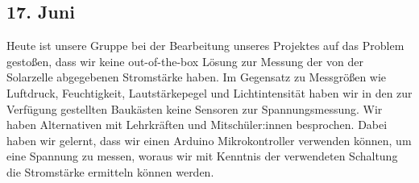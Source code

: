 \subsection{17. Juni}
Heute ist unsere Gruppe bei der Bearbeitung unseres Projektes auf das Problem gestoßen, dass wir keine out-of-the-box Lösung zur Messung der von der Solarzelle abgegebenen Stromstärke haben. Im Gegensatz zu Messgrößen wie Luftdruck, Feuchtigkeit, Lautstärkepegel und Lichtintensität haben wir in den zur Verfügung gestellten Baukästen keine Sensoren zur Spannungsmessung. Wir haben Alternativen mit Lehrkräften und Mitschüler:innen besprochen. Dabei haben wir gelernt, dass wir einen Arduino Mikrokontroller verwenden können, um eine Spannung zu messen, woraus wir mit Kenntnis der verwendeten Schaltung die Stromstärke ermitteln können werden. 